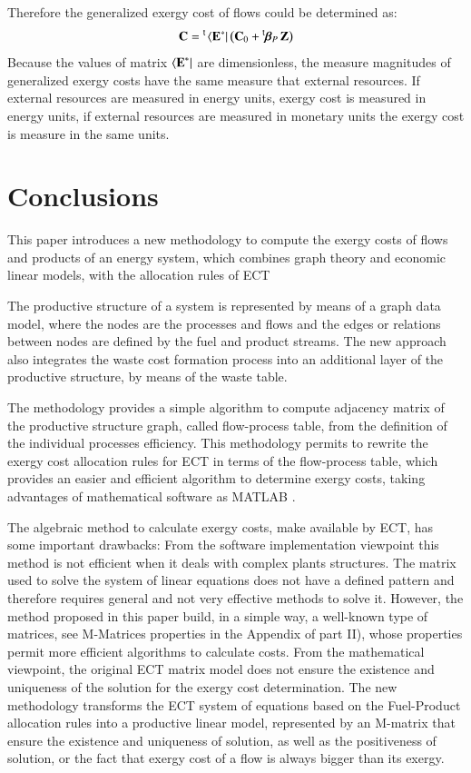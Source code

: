 \documentclass{ecos2018}
\begin{document}
Therefore the generalized exergy cost of flows could be determined as:
\begin{equation}
\mathbf{C}=\prescript{\smash{\mathsf{t}}}{}{\mskip-1mu}\left\langle {\textbf{E}^\ast } \right|\left( \mathbf{C}_0 + \prescript{\smash{\mathsf{t}}}{}{\mskip-1mu}\bm{\beta}_P\,\mathbf{Z}\right )
\end{equation}
Because the values of matrix $\left\langle {\textbf{E}^\ast } \right|$ are dimensionless, the measure magnitudes of generalized exergy costs have the same measure that external resources. If external resources are measured in energy units, exergy cost is measured in energy units, if external resources are measured in monetary units the exergy cost is measure in the same units. 

\section{Conclusions}
This paper introduces a new methodology to compute the exergy costs of flows and products of an energy system, which combines graph theory and economic linear models, with the allocation rules of ECT

The productive structure of a system is represented by means of a graph data model, where the nodes are the processes and flows and the edges or relations between nodes are defined by the fuel and product streams. The new approach also integrates the waste cost formation process into an additional layer of the productive structure, by means of the waste table.

The methodology provides a simple algorithm to compute adjacency matrix of the productive structure graph, called flow-process table, from the definition of the individual processes efficiency. This methodology permits to rewrite the exergy cost allocation rules for ECT in terms of the flow-process table, which provides an easier and efficient algorithm to determine exergy costs, taking advantages of  mathematical software as MATLAB \circledR.

The algebraic method to calculate exergy costs, make available by ECT, has some important drawbacks:
From the software implementation viewpoint this method is not efficient when it deals with complex plants structures. The matrix used to solve the system of linear equations does not have a defined pattern and therefore requires general and not very effective methods to solve it. However, the method proposed in this paper build, in a simple way, a well-known type of matrices, see M-Matrices properties in the Appendix of part II), whose properties permit more efficient algorithms to calculate costs. From the mathematical viewpoint, the original ECT matrix model does not ensure the existence and uniqueness of the solution for the exergy cost determination. The new methodology transforms the ECT system of equations based on the Fuel-Product allocation rules into a productive linear model, represented by an M-matrix that ensure the existence and uniqueness of solution, as well as the positiveness of solution, or the fact that exergy cost of a flow is always bigger than its exergy.
\end{document}
